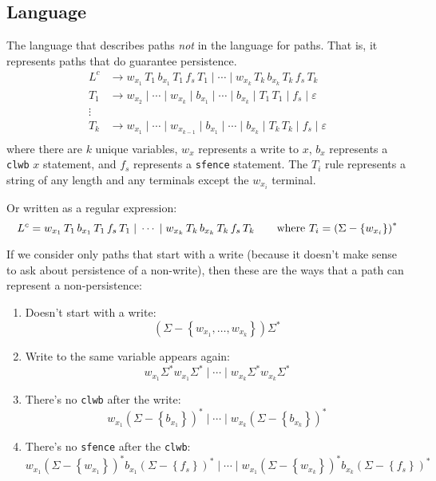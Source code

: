 \documentclass[11pt]{article}
\begin{document}
\subsection{Language}
The language that describes paths \textit{not} in the language for paths. That is, it represents paths that do guarantee persistence.
\begin{align*}
    L^{c} & \to w_{x_1}\, T_1\, b_{x_1}\, T_1\, f_s\, T_1 \;\vert\; \cdots \;\vert\; w_{x_k}\, T_k\, b_{x_k}\, T_k\, f_s\, T_k \\
    T_1 & \to w_{x_2} \;\vert\; \cdots \;\vert\; w_{x_k} \;\vert\; b_{x_1} \;\vert\; \cdots \;\vert\; b_{x_k} \;\vert\; T_1 \, T_1 \;\vert\; f_s \;\vert\; \varepsilon \\
    \vdots & \\
    T_k & \to w_{x_1} \;\vert\; \cdots \;\vert\; w_{x_{k-1}} \;\vert\; b_{x_1} \;\vert\; \cdots \;\vert\; b_{x_k} \;\vert\; T_k \, T_k \;\vert\; f_s \;\vert\; \varepsilon\\
\end{align*}
where there are $k$ unique variables, $w_x$ represents a write to $x$, $b_{x}$ represents a \texttt{clwb} $x$ statement, and $f_s$ represents a \texttt{sfence} statement. The $T_i$ rule represents a string of any length and any terminals except the $w_{x_i}$ terminal.

Or written as a regular expression:
\[L^c = w_{x_1}\, T_1 \, b_{x_1}\, T_1\, f_s\, T_1 \;\vert\; \cdots \;\vert\; w_{x_k}\, T_k\, b_{x_k}\, T_k\, f_s\, T_k \qquad \textnormal{where }T_i = \left( \Sigma - \left\{ w_{x_i} \right\} \right)^*\]


If we consider only paths that start with a write (because it doesn't make sense to ask about persistence of a non-write), then these are the ways that a path can represent a non-persistence:
\begin{enumerate}
    \item Doesn't start with a write:
    \[
        \left( \Sigma - \left\{ w_{x_1}, \ldots, w_{x_k} \right\} \right) \Sigma^*
    \]

    \item Write to the same variable appears again:
    \[
        w_{x_1} \Sigma^* w_{x_1} \Sigma^* \;\vert\; \cdots \;\vert\; w_{x_k} \Sigma^* w_{x_k} \Sigma^*
    \]
    \item There's no \texttt{clwb} after the write:
    \[
        w_{x_1} \left( \Sigma - \left\{ b_{x_1} \right\} \right)^* \;\vert\; \cdots \;\vert\; w_{x_k} \left( \Sigma - \left\{ b_{x_k} \right\} \right)^*
    \]
    \item There's no \texttt{sfence} after the \texttt{clwb}:
    \[
        w_{x_1} \left( \Sigma - \left\{ w_{x_1} \right\} \right)^* b_{x_1} \left( \Sigma - \left\{ f_s \right\} \right)^* \;\vert\; \cdots \;\vert\; w_{x_1} \left( \Sigma - \left\{ w_{x_k} \right\} \right)^* b_{x_k} \left( \Sigma - \left\{ f_s \right\} \right)^*
    \]
\end{enumerate}
\end{document}

